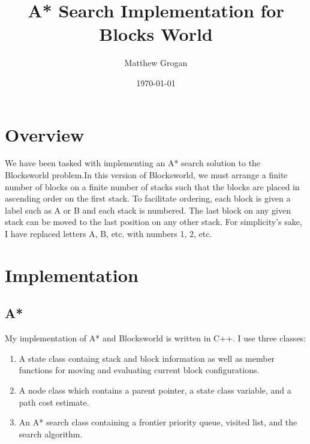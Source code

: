 \documentclass{article}
\title{A* Search Implementation for Blocks World} %
\author{Matthew Grogan} %
\date{\today} %
\begin{document}
\maketitle %



\section{Overview}

We have been tasked with implementing an A* search solution to the Blocksworld
problem.In this version of Blocksworld, we must arrange a finite number of blocks on a finite
number of stacks such that the blocks are placed in ascending order on the first
stack. To facilitate ordering, each block is given a label such as A or B and
each stack is numbered. The last block on any given stack can be moved to the
last position on any other stack. For simplicity's sake, I have replaced letters 
A, B, etc. with numbers 1, 2, etc. 


\section{Implementation}
\subsection{A*}

My implementation of A* and Blocksworld is written in C++. I use three
classes:
\begin{enumerate}
    \item A state class containg stack and block information as well as member
	functions for moving and evaluating current block configurations.
    \item A node class which contains a parent pointer, a state class variable,
	and a path cost estimate.
    \item An A* search class containing a frontier priority queue, visited list,
	and the search algorithm.
\end{enumerate}
\end{document}
